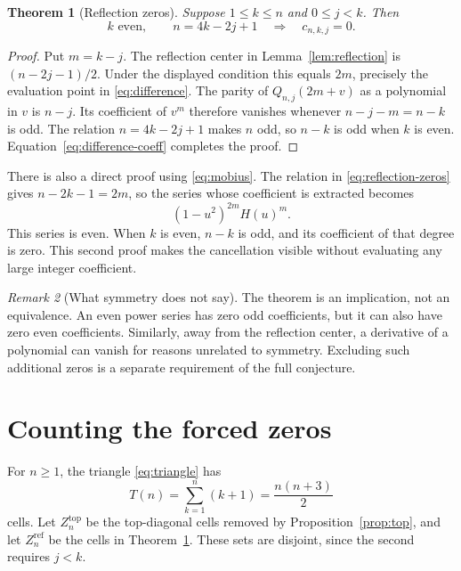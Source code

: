 \documentclass[11pt]{article}
\numberwithin{equation}{section}
\newtheorem{theorem}{Theorem}[section]
\theoremstyle{definition}
\theoremstyle{remark}
\newtheorem{remark}[theorem]{Remark}
\begin{document}
\begin{theorem}[Reflection zeros]\label{thm:reflection-zeros}
Suppose $1\le k\le n$ and $0\le j<k$. Then
\begin{equation}\label{eq:reflection-zeros}
 k\text{ even},\qquad n=4k-2j+1
 \quad\Longrightarrow\quad c_{n,k,j}=0.
\end{equation}
\end{theorem}
\begin{proof}
Put $m=k-j$. The reflection center in Lemma~\ref{lem:reflection} is
$(n-2j-1)/2$. Under the displayed condition this equals $2m$, precisely
the evaluation point in \eqref{eq:difference}. The parity of
$Q_{n,j}(2m+v)$ as a polynomial in $v$ is $n-j$. Its coefficient of $v^m$
therefore vanishes whenever $n-j-m=n-k$ is odd. The relation
$n=4k-2j+1$ makes $n$ odd, so $n-k$ is odd when $k$ is even.
Equation~\eqref{eq:difference-coeff} completes the proof.
\end{proof}

There is also a direct proof using \eqref{eq:mobius}. The relation in
\eqref{eq:reflection-zeros} gives $n-2k-1=2m$, so the series whose
coefficient is extracted becomes
\begin{equation}\label{eq:even-kernel}
 (1-u^2)^{2m}H(u)^m.
\end{equation}
This series is even. When $k$ is even, $n-k$ is odd, and its coefficient
of that degree is zero. This second proof makes the cancellation visible
without evaluating any large integer coefficient.

\begin{remark}[What symmetry does not say]\label{rem:symmetry-gap}
The theorem is an implication, not an equivalence. An even power series
has zero odd coefficients, but it can also have zero even coefficients.
Similarly, away from the reflection center, a derivative of a polynomial
can vanish for reasons unrelated to symmetry. Excluding such additional
zeros is a separate requirement of the full conjecture.
\end{remark}

\section{Counting the forced zeros}\label{sec:counting}
For $n\ge1$, the triangle \eqref{eq:triangle} has
\begin{equation}\label{eq:triangle-size}
 T(n)=\sum_{k=1}^n(k+1)=\frac{n(n+3)}2
\end{equation}
cells. Let $Z_n^{\mathrm{top}}$ be the top-diagonal cells removed by
Proposition~\ref{prop:top}, and let $Z_n^{\mathrm{ref}}$ be the cells in
Theorem~\ref{thm:reflection-zeros}. These sets are disjoint, since the
second requires $j<k$.
\end{document}
